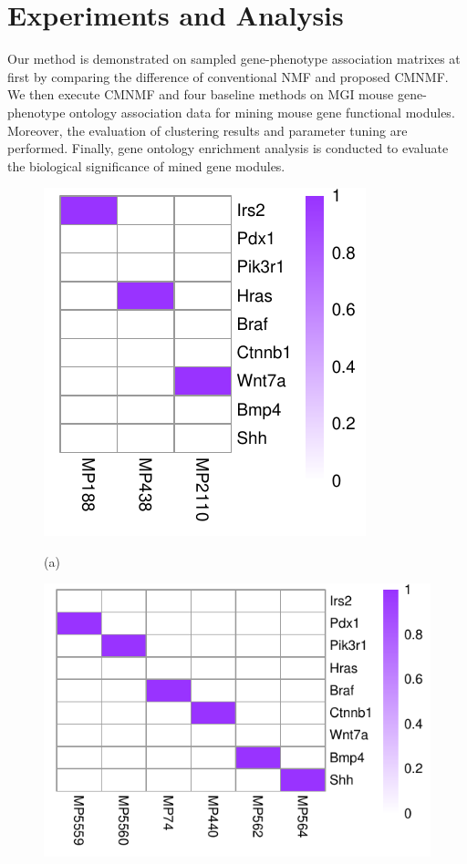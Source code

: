 \documentclass{bmcart}
\begin{document}
\section*{Experiments and Analysis}
Our method is demonstrated on sampled gene-phenotype association matrixes at first by comparing the difference of conventional NMF and proposed CMNMF. We then execute CMNMF and four baseline methods on MGI mouse gene-phenotype ontology association data for mining mouse gene functional modules. Moreover, the evaluation of clustering results and parameter tuning are performed. Finally, gene ontology enrichment analysis is conducted to evaluate the biological significance of mined gene modules.
\begin{figure}[!h]
  \centering
  \begin{minipage}{.20\linewidth}
  \centering
    \includegraphics[width=\linewidth]{DrawPictures/v_1.pdf}
    \centerline{(a)}
  \end{minipage}
  \begin{minipage}{.30\linewidth}
   \includegraphics[width=\linewidth]{DrawPictures/v_2.pdf}

\end{minipage}
\end{figure}
\end{document}
